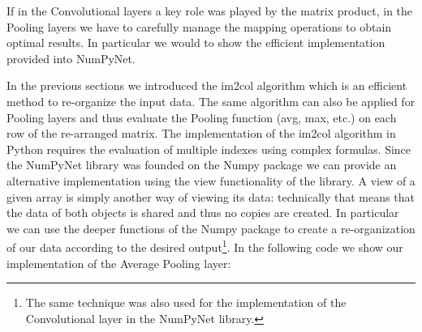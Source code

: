 \documentclass{standalone}
\begin{document}
If in the Convolutional layers a key role was played by the matrix product, in the Pooling layers we have to carefully manage the mapping operations to obtain optimal results.
In particular we would to show the efficient implementation provided into NumPyNet.

In the previous sections we introduced the \textsf{im2col} algorithm which is an efficient method to re-organize the input data.
The same algorithm can also be applied for Pooling layers and thus evaluate the Pooling function (avg, max, etc.) on each row of the re-arranged matrix.
The implementation of the \textsf{im2col} algorithm in Python requires the evaluation of multiple indexes using complex formulas.
Since the NumPyNet library was founded on the Numpy package we can provide an alternative implementation using the \textsf{view} functionality of the library.
A \textsf{view} of a given array is simply another way of viewing its data: technically that means that the data of both objects is shared and thus no copies are created.
In particular we can use the deeper functions of the Numpy package to create a re-organization of our data according to the desired output\footnote{
  The same technique was also used for the implementation of the Convolutional layer in the NumPyNet library.
}.
In the following code we show our implementation of the Average Pooling layer:
\end{document}
